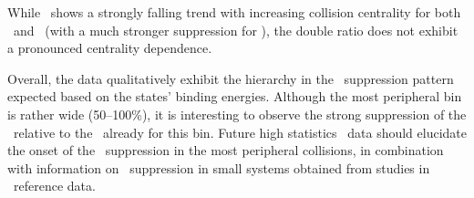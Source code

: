 While \Raa\ shows a strongly falling trend with increasing collision centrality
for both \PgUa\ and \PgUb\ (with a much stronger suppression for \PgUb), the 
double ratio does not exhibit a pronounced centrality dependence.

Overall, the data qualitatively exhibit the hierarchy in the \PgUn\ suppression pattern
expected based on the states' binding energies. Although the most peripheral bin
is rather wide (50--100\%), it is interesting to observe the strong suppression of the 
\PgUb\ relative to the \PgUa\ already for this bin. Future high statistics \PbPb\ data 
should elucidate the onset of the \PgU\ suppression in the most peripheral collisions,
in combination with information on \PgU\ suppression in small systems obtained from
studies in \pPb\ reference data. 

